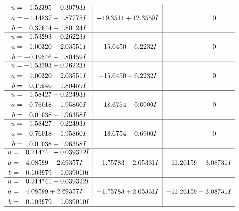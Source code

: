 \documentclass[1p]{elsarticle_modified}
\theoremstyle{definition}
\begin{document}
$$\begin{array}{c|c|c}
\begin{aligned}
u &= \phantom{-}1.52395 - 0.30793 I \\
a &= -1.14837 + 1.87775 I \\
b &= \phantom{-}0.37644 + 1.80124 I\end{aligned}
 & -19.3511 + 12.3559 I & \phantom{-0.000000 } 0 \\ \hline\begin{aligned}
u &= -1.53293 + 0.26223 I \\
a &= \phantom{-}1.00320 - 2.03551 I \\
b &= -0.19546 - 1.80459 I\end{aligned}
 & -15.6450 + 6.2232 I & \phantom{-0.000000 } 0 \\ \hline\begin{aligned}
u &= -1.53293 - 0.26223 I \\
a &= \phantom{-}1.00320 + 2.03551 I \\
b &= -0.19546 + 1.80459 I\end{aligned}
 & -15.6450 - 6.2232 I & \phantom{-0.000000 } 0 \\ \hline\begin{aligned}
u &= \phantom{-}1.58427 + 0.22493 I \\
a &= -0.76018 - 1.95860 I \\
b &= \phantom{-}0.01038 - 1.96358 I\end{aligned}
 & \phantom{-}18.6754 - 0.6900 I & \phantom{-0.000000 } 0 \\ \hline\begin{aligned}
u &= \phantom{-}1.58427 - 0.22493 I \\
a &= -0.76018 + 1.95860 I \\
b &= \phantom{-}0.01038 + 1.96358 I\end{aligned}
 & \phantom{-}18.6754 + 0.6900 I & \phantom{-0.000000 } 0 \\ \hline\begin{aligned}
u &= \phantom{-}0.214741 + 0.039322 I \\
a &= \phantom{-}4.08599 - 2.69357 I \\
b &= -0.103979 - 1.039010 I\end{aligned}
 & -1.75783 - 2.05331 I & -11.26159 + 3.08731 I \\ \hline\begin{aligned}
u &= \phantom{-}0.214741 - 0.039322 I \\
a &= \phantom{-}4.08599 + 2.69357 I \\
b &= -0.103979 + 1.039010 I\end{aligned}
 & -1.75783 + 2.05331 I & -11.26159 - 3.08731 I\\
 \hline 
 \end{array}$$\newpage\newpage\renewcommand{\arraystretch}{1}
\end{document}
